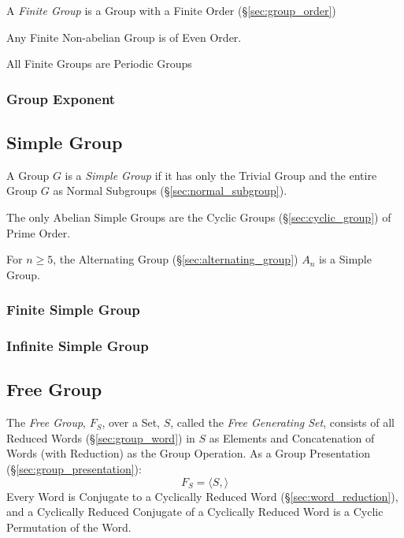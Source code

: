 A \emph{Finite Group} is a Group with a Finite Order
(\S\ref{sec:group_order})

Any Finite Non-abelian Group is of Even Order.

All Finite Groups are Periodic Groups



\subsubsection{Group Exponent}\label{sec:group_exponent}



\subsection{Simple Group}\label{sec:simple_group}

A Group $G$ is a \emph{Simple Group} if it has only the Trivial Group
and the entire Group $G$ as Normal Subgroups
(\S\ref{sec:normal_subgroup}).

The only Abelian Simple Groups are the Cyclic Groups
(\S\ref{sec:cyclic_group}) of Prime Order.

For $n \geq 5$, the Alternating Group (\S\ref{sec:alternating_group})
$A_n$ is a Simple Group.



\subsubsection{Finite Simple Group}\label{sec:finite_simple_group}

\subsubsection{Infinite Simple Group}\label{sec:infinite_simple_group}



\subsection{Free Group}\label{sec:free_group}

The \emph{Free Group}, $F_S$, over a Set, $S$, called the \emph{Free
  Generating Set}, consists of all Reduced Words
(\S\ref{sec:group_word}) in $S$ as Elements and Concatenation of Words
(with Reduction) as the Group Operation. As a Group Presentation
(\S\ref{sec:group_presentation}):
\[
    F_S = \langle S, \rangle
\]
Every Word is Conjugate to a Cyclically Reduced Word
(\S\ref{sec:word_reduction}), and a Cyclically Reduced Conjugate of a
Cyclically Reduced Word is a Cyclic Permutation of the Word.

